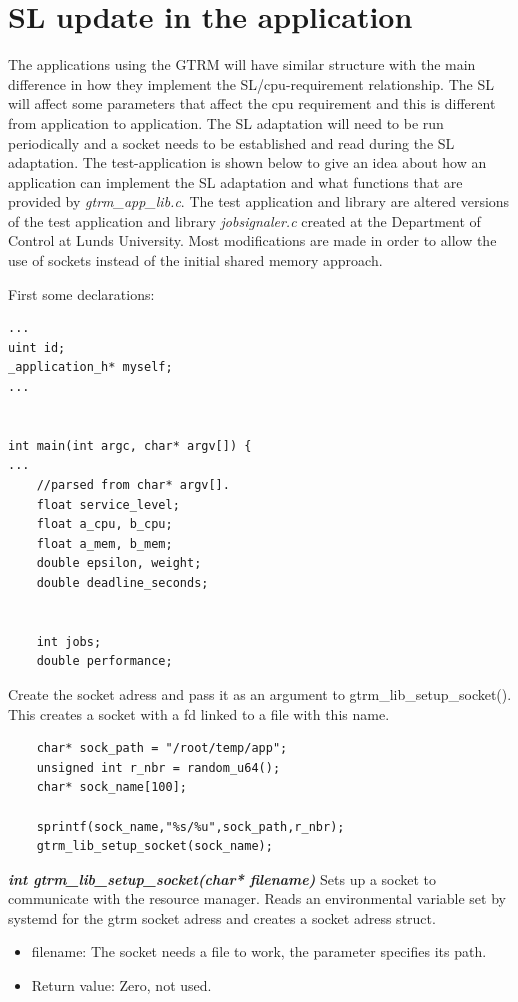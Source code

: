 \documentclass[nobiblatex]{LTHthesis}
\begin{document}
\section{SL update in the application}
The applications using the GTRM will have similar structure with the main difference in how they implement the SL/cpu-requirement relationship. 
The SL will affect some parameters that affect the cpu requirement and this is different from application to application. 
The SL adaptation will need to be run periodically and a socket needs to be established and read during the SL adaptation. 
The test-application is shown below to give an idea about how an application can implement the SL adaptation and what functions that are provided by \emph{gtrm\_app\_lib.c}.
The test application and library are altered versions of the test application and library \emph{jobsignaler.c} created at the Department of Control at Lunds University.
Most modifications are made in order to allow the use of  sockets instead of the initial shared memory approach.



First some declarations:
\begin{verbatim}
...
uint id;
_application_h* myself;
...	


int main(int argc, char* argv[]) {
...
	//parsed from char* argv[].
	float service_level;
	float a_cpu, b_cpu;
	float a_mem, b_mem;
	double epsilon, weight;
	double deadline_seconds;
	
		
	int jobs;
	double performance;
\end{verbatim}


Create the socket adress and pass it as an argument to gtrm\_lib\_setup\_socket(). This creates a socket with a fd linked to a file with this name.
\begin{verbatim}
	char* sock_path = "/root/temp/app";
	unsigned int r_nbr = random_u64();
	char* sock_name[100];

	sprintf(sock_name,"%s/%u",sock_path,r_nbr);
	gtrm_lib_setup_socket(sock_name);
\end{verbatim}


\begin{framed}
	\begin{flushleft}		
		\emph{\textbf{{int gtrm\_lib\_setup\_socket(char* filename)}}}
		Sets up a socket to communicate with the resource manager. Reads an environmental variable set by systemd for the gtrm socket adress and creates a socket adress struct.
		\begin{itemize}
		\item filename: The socket needs a file to work, the parameter specifies its path.
		\item Return value: Zero, not used.
		\end{itemize}
	\end{flushleft}
\end{framed}
\end{document}
